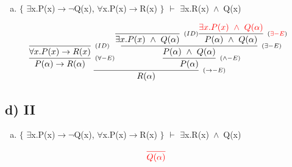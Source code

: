 \documentclass[aspectratio=43]{beamer}
\newcommand{\ria}{$\rightarrow$}
\newcommand{\fall}{$\forall$}
\newcommand{\ex}{$\exists$}
\newcommand{\nao}{$\neg$}
\newcommand{\andd}{$\wedge$}
\begin{document}
    \begin{frame}[fragile]
    
    	\begin{enumerate}[d)]
			\item $\{$ \ex x.P(x)\ria \nao Q(x), \fall x.P(x)\ria R(x) $\}$ $\vdash$ \ex x.R(x)\ \andd\ Q(x) \\
		\end{enumerate}
        
        \vspace{65pt}
        
        \[
        \begin{array}{c}
		
        	\infer[_{(\to -E)}]
            	{R(\alpha)}
            	{\infer[_{(\forall -E)}]
                	{P(\alpha) \rightarrow R(\alpha)} 
                    {\infer[_{(ID)}]
                    	{\forall x.P(x)\to R(x)}
                    	{}
                    }  
            	\infer[_{(\land -E)}] 
                	{P(\alpha)}
                    {\infer[_{(\exists -E)}]
                    	{P(\alpha)\ \land \ Q(\alpha)}
                    	{\infer[_{(ID)}]
                        	{\exists x.P(x)\ \land \ Q(\alpha)}
                            {}
                        \infer[_{(\textcolor{red}{\exists -E})}] 
                        	{P(\alpha)\ \land \ Q(\alpha)}
                            {\textcolor{red}{\exists x.P(x)\ \land \ Q(\alpha)}}
                        }
                    }
                }
		\end{array}
        \]
        
	\end{frame}
    
  
    \subsection{d) II}
    
    \begin{frame}[fragile]
    
    	\begin{enumerate}[d)]
			\item $\{$ \ex x.P(x)\ria \nao Q(x), \fall x.P(x)\ria R(x) $\}$ $\vdash$ \ex x.R(x)\ \andd\ Q(x) \\
		\end{enumerate}
        
        \vspace{75pt}
        
        \[
        \begin{array}{c}
		
        	\textcolor{red}{
            \infer[_{}]
            	{Q(\alpha)}
            	{}
        	}
		\end{array}
        \]
        
	\end{frame}
    
\end{document}
